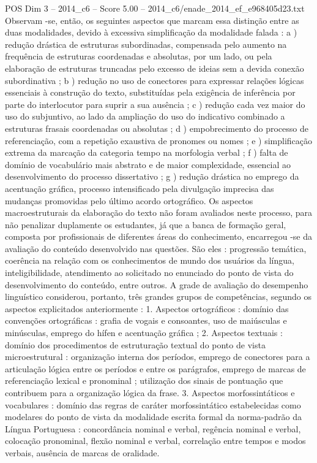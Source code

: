 \begin{textsample}{POS Dim 3 – 2014\_c6 – Score 5.00 – 2014\_c6/enade\_2014\_ef\_e968405d23.txt}
Observam -se, então, os seguintes aspectos que marcam essa distinção entre as duas modalidades, devido à excessiva simplificação da modalidade falada : a ) redução drástica de estruturas subordinadas, compensada pelo aumento na frequência de estruturas coordenadas e absolutas, por um lado, ou pela elaboração de estruturas truncadas pelo excesso de ideias sem a devida conexão subordinativa ; b ) redução no uso de conectores para expressar relações lógicas essenciais à construção do texto, substituídas pela exigência de inferência por parte do interlocutor para suprir a sua ausência ; c ) redução cada vez maior do uso do subjuntivo, ao lado da ampliação do uso do indicativo combinado a estruturas frasais coordenadas ou absolutas ; d ) empobrecimento do processo de referenciação, com a repetição exaustiva de pronomes ou nomes ; e ) simplificação extrema da marcação da categoria tempo na morfologia verbal ; f ) falta de domínio de vocabulário mais abstrato e de maior complexidade, essencial ao desenvolvimento do processo dissertativo ; g ) redução drástica no emprego da acentuação gráfica, processo intensificado pela divulgação imprecisa das mudanças promovidas pelo último acordo ortográfico.
Os aspectos macroestruturais da elaboração do texto não foram avaliados neste processo, para não penalizar duplamente os estudantes, já que a banca de formação geral, composta por profissionais de diferentes áreas do conhecimento, encarregou -se da avaliação do conteúdo desenvolvido nas questões.
São eles : progressão temática, coerência na relação com os conhecimentos de mundo dos usuários da língua, inteligibilidade, atendimento ao solicitado no enunciado do ponto de vista do desenvolvimento do conteúdo, entre outros.
A grade de avaliação do desempenho linguístico considerou, portanto, três grandes grupos de competências, segundo os aspectos explicitados anteriormente : 1.
Aspectos ortográficos : domínio das convenções ortográficas : grafia de vogais e consoantes, uso de maiúsculas e minúsculas, emprego do hífen e acentuação gráfica ; 2.
Aspectos textuais : domínio dos procedimentos de estruturação textual do ponto de vista microestrutural : organização interna dos períodos, emprego de conectores para a articulação lógica entre os períodos e entre os parágrafos, emprego de marcas de referenciação lexical e pronominal ; utilização dos sinais de pontuação que contribuem para a organização lógica da frase. 3.
Aspectos morfossintáticos e vocabulares : domínio das regras de caráter morfossintático estabelecidas como modelares do ponto de vista da modalidade escrita formal da norma-padrão da Língua Portuguesa : concordância nominal e verbal, regência nominal e verbal, colocação pronominal, flexão nominal e verbal, correlação entre tempos e modos verbais, ausência de marcas de oralidade.

\end{textsample}
